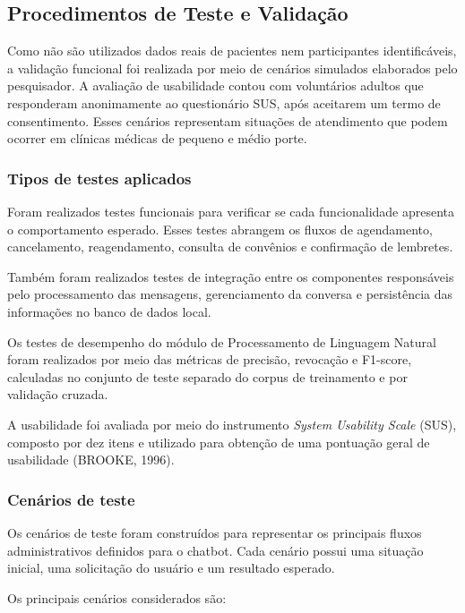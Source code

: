 \documentclass[12pt,a4paper]{extarticle}
\begin{document}
\subsection{Procedimentos de Teste e Validação}
\label{sec:testes-metodo}

Como não são utilizados dados reais de pacientes nem participantes identificáveis, a validação funcional foi realizada por meio de cenários simulados elaborados pelo pesquisador. A avaliação de usabilidade contou com voluntários adultos que responderam anonimamente ao questionário SUS, após aceitarem um termo de consentimento. Esses cenários representam situações de atendimento que podem ocorrer em clínicas médicas de pequeno e médio porte.

\subsubsection{Tipos de testes aplicados}
\label{sec:tipos-metodo}

Foram realizados testes funcionais para verificar se cada funcionalidade apresenta o comportamento esperado. Esses testes abrangem os fluxos de agendamento, cancelamento, reagendamento, consulta de convênios e confirmação de lembretes.

Também foram realizados testes de integração entre os componentes responsáveis pelo processamento das mensagens, gerenciamento da conversa e persistência das informações no banco de dados local.

Os testes de desempenho do módulo de Processamento de Linguagem Natural foram realizados por meio das métricas de precisão, revocação e F1-score, calculadas no conjunto de teste separado do corpus de treinamento e por validação cruzada.

A usabilidade foi avaliada por meio do instrumento \textit{System Usability Scale} (SUS), composto por dez itens e utilizado para obtenção de uma pontuação geral de usabilidade (BROOKE, 1996).

\subsubsection{Cenários de teste}
\label{sec:cenarios-metodo}

Os cenários de teste foram construídos para representar os principais fluxos administrativos definidos para o chatbot. Cada cenário possui uma situação inicial, uma solicitação do usuário e um resultado esperado.

Os principais cenários considerados são:
\end{document}
